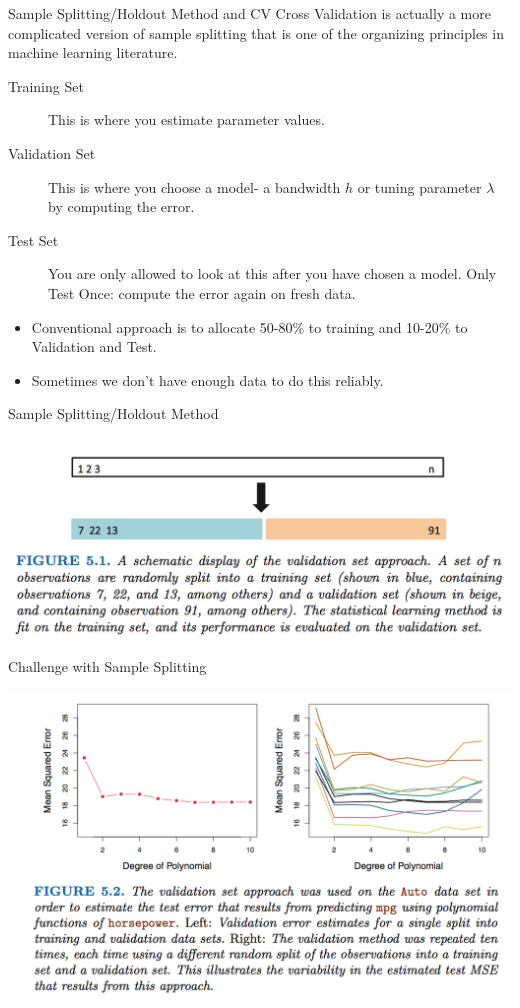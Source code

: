 \begin{frame}{Sample Splitting/Holdout Method and CV}
  Cross Validation is actually a more complicated version of \alert{sample splitting} that is one of the organizing principles in machine learning literature.
  
  \begin{description}
  \item[Training Set] This is where you estimate parameter values.
  \item[Validation Set] This is where you choose a model- a bandwidth $h$ or tuning parameter $\lambda$ by computing the error.
  \item[Test Set] You are only allowed to look at this after you have chosen a model. \alert{Only Test Once}: compute the error again on fresh data.
  \end{description}
  \begin{itemize}
  \item Conventional approach is to allocate 50-80\% to training and 10-20\% to Validation and Test.
  \item Sometimes we don't have enough data to do this reliably.
  \end{itemize}
  \end{frame}
  
\begin{frame}{Sample Splitting/Holdout Method}
  \begin{center}
  \includegraphics[width=\textwidth]{./resources/split-sample}
  \end{center}
\end{frame}
  
\begin{frame}{Challenge with Sample Splitting}
  \begin{center}
  \includegraphics[width=\textwidth]{./resources/validation-10fold}
  \end{center}
\end{frame}
  

